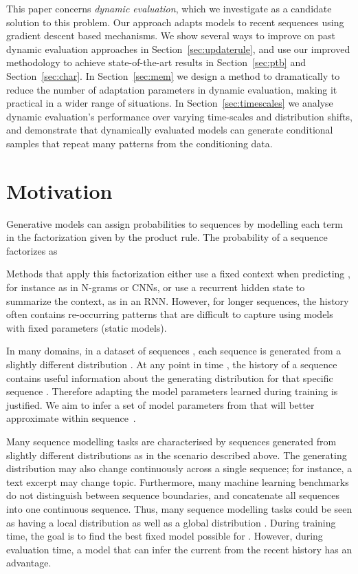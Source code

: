 \documentclass{article} \usepackage{iclr2018_conference,times}
\begin{document}
This paper concerns \emph{dynamic evaluation}, which we investigate as a candidate solution to this problem. Our approach adapts models to recent sequences using gradient descent based mechanisms. We show several ways to improve on past dynamic evaluation approaches in Section~\ref{sec:updaterule}, and use our improved methodology to achieve state-of-the-art results in Section~\ref{sec:ptb} and Section~\ref{sec:char}. In Section~\ref{sec:mem} we design a method to dramatically to reduce the number of adaptation parameters in dynamic evaluation, making it practical in a wider range of situations. In Section~\ref{sec:timescales} we analyse dynamic evaluation's performance over varying time-scales and distribution shifts, and demonstrate that dynamically evaluated models can generate conditional samples that repeat many patterns from the conditioning data. 

\section{Motivation}
Generative models can assign probabilities to sequences by modelling each term in the factorization given by the product rule. 
The probability of a sequence  factorizes as
 
Methods that apply this factorization either use a fixed context when predicting , for instance as in N-grams or CNNs, or use a recurrent hidden state to summarize the context, as in an RNN\@. However, for longer sequences, the history  often contains re-occurring patterns that are difficult to capture using models with fixed parameters (static models).

In many domains, in a dataset of sequences , each sequence  is generated from a slightly different distribution . At any point in time , the history of a sequence  contains useful information about the generating distribution for that specific sequence .  Therefore adapting the model parameters learned during training  is justified. We aim to infer a set of model parameters  from  that will better approximate  within sequence~.


Many sequence modelling tasks are characterised by sequences generated from slightly different distributions as in the scenario described above. The generating distribution may also change continuously across a single sequence; for instance, a text excerpt may change topic. Furthermore, many machine learning benchmarks do not distinguish between sequence boundaries, and concatenate all sequences into one continuous sequence. 
Thus, many sequence modelling tasks could be seen as having a local distribution  as well as a global distribution . During training time, the goal is to find the best fixed model possible for . However, during evaluation time, a model that can infer the current  from the recent history has an advantage.
\end{document}
